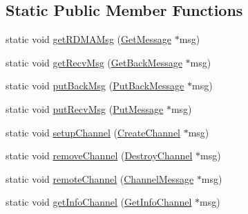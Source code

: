 \subsection*{Static Public Member Functions}
\begin{DoxyCompactItemize}
\item 
static void \hyperlink{structvt_1_1rdma_1_1_r_d_m_a_manager_aba5002562451e1264979003dcf1e659e}{get\+R\+D\+M\+A\+Msg} (\hyperlink{namespacevt_1_1rdma_acce0da4c9ea1233c3f132c1971943653}{Get\+Message} $\ast$msg)
\item 
static void \hyperlink{structvt_1_1rdma_1_1_r_d_m_a_manager_a1c11e7b5616c22d03fd3884f99d3e7ff}{get\+Recv\+Msg} (\hyperlink{namespacevt_1_1rdma_a72a94b92eba75ec9fec43b2a9a4ad878}{Get\+Back\+Message} $\ast$msg)
\item 
static void \hyperlink{structvt_1_1rdma_1_1_r_d_m_a_manager_ad8525c38d7d47c1e96a6ed4399e5b1ef}{put\+Back\+Msg} (\hyperlink{namespacevt_1_1rdma_a07a52401fe8185d190371b3333dc61ac}{Put\+Back\+Message} $\ast$msg)
\item 
static void \hyperlink{structvt_1_1rdma_1_1_r_d_m_a_manager_a87d44e05aeeb404290ac2a38b4631fe0}{put\+Recv\+Msg} (\hyperlink{namespacevt_1_1rdma_ae0a0330c647ec5ac5d508750f4cd4a06}{Put\+Message} $\ast$msg)
\item 
static void \hyperlink{structvt_1_1rdma_1_1_r_d_m_a_manager_a5189682bba9e4b73faa010bf78f96469}{setup\+Channel} (\hyperlink{structvt_1_1rdma_1_1_create_channel}{Create\+Channel} $\ast$msg)
\item 
static void \hyperlink{structvt_1_1rdma_1_1_r_d_m_a_manager_a240f9f8c6697b4fc94c8a8b1b4d6c737}{remove\+Channel} (\hyperlink{namespacevt_1_1rdma_a1273aeddd73c1ffac0d7383ef7a314d8}{Destroy\+Channel} $\ast$msg)
\item 
static void \hyperlink{structvt_1_1rdma_1_1_r_d_m_a_manager_a8c2cb5f8770dfe6265065c6040314399}{remote\+Channel} (\hyperlink{structvt_1_1rdma_1_1_channel_message}{Channel\+Message} $\ast$msg)
\item 
static void \hyperlink{structvt_1_1rdma_1_1_r_d_m_a_manager_a7e01a11f17c52dee2d564341866e2e29}{get\+Info\+Channel} (\hyperlink{structvt_1_1rdma_1_1_get_info_channel}{Get\+Info\+Channel} $\ast$msg)
\end{DoxyCompactItemize}
